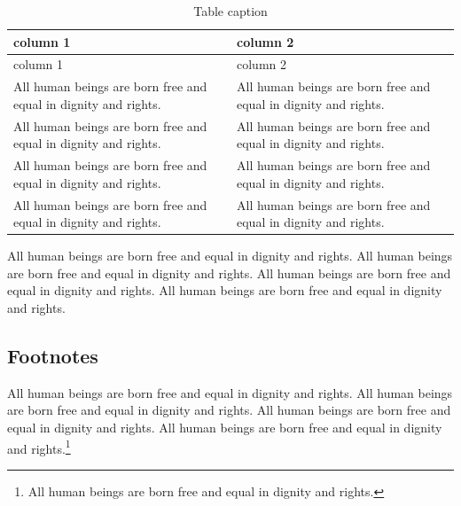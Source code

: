 \documentclass[
  ngerman,
  american,
  ]{scrartcl}
\begin{document}
\begin{longtable}[]{@{}
  >{\raggedright\arraybackslash}p{}
  >{\raggedright\arraybackslash}p{}@{}}
\caption{Table caption}\tabularnewline
\toprule\noalign{}
\begin{minipage}[b]{\linewidth}\raggedright
column 1
\end{minipage} & \begin{minipage}[b]{\linewidth}\raggedright
column 2
\end{minipage} \\
\midrule\noalign{}
\endfirsthead
\toprule\noalign{}
\begin{minipage}[b]{\linewidth}\raggedright
column 1
\end{minipage} & \begin{minipage}[b]{\linewidth}\raggedright
column 2
\end{minipage} \\
\midrule\noalign{}
\endhead
\bottomrule\noalign{}
\endlastfoot
All human beings are born free and equal in dignity and rights. & All
human beings are born free and equal in dignity and rights. \\
All human beings are born free and equal in dignity and rights. & All
human beings are born free and equal in dignity and rights. \\
All human beings are born free and equal in dignity and rights. & All
human beings are born free and equal in dignity and rights. \\
All human beings are born free and equal in dignity and rights. & All
human beings are born free and equal in dignity and rights. \\
\end{longtable}

All human beings are born free and equal in dignity and rights. All
human beings are born free and equal in dignity and rights. All human
beings are born free and equal in dignity and rights. All human beings
are born free and equal in dignity and rights.

\subsection{Footnotes}\label{footnotes}

All human beings are born free and equal in dignity and rights. All
human beings are born free and equal in dignity and rights. All human
beings are born free and equal in dignity and rights. All human beings
are born free and equal in dignity and rights.\footnote{All human beings
  are born free and equal in dignity and rights.}
\end{document}
